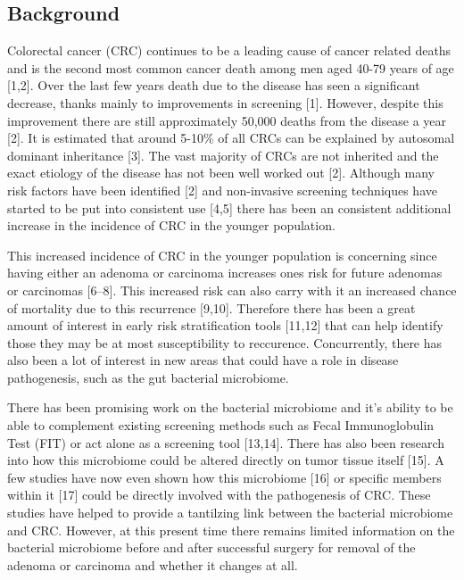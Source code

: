 \documentclass[12pt,]{article}
\begin{document}
\newpage

\subsection{Background}\label{background}

Colorectal cancer (CRC) continues to be a leading cause of cancer
related deaths and is the second most common cancer death among men aged
40-79 years of age {[}1,2{]}. Over the last few years death due to the
disease has seen a significant decrease, thanks mainly to improvements
in screening {[}1{]}. However, despite this improvement there are still
approximately 50,000 deaths from the disease a year {[}2{]}. It is
estimated that around 5-10\% of all CRCs can be explained by autosomal
dominant inheritance {[}3{]}. The vast majority of CRCs are not
inherited and the exact etiology of the disease has not been well worked
out {[}2{]}. Although many risk factors have been identified {[}2{]} and
non-invasive screening techniques have started to be put into consistent
use {[}4,5{]} there has been an consistent additional increase in the
incidence of CRC in the younger population.

This increased incidence of CRC in the younger population is concerning
since having either an adenoma or carcinoma increases ones risk for
future adenomas or carcinomas {[}6--8{]}. This increased risk can also
carry with it an increased chance of mortality due to this recurrence
{[}9,10{]}. Therefore there has been a great amount of interest in early
risk stratification tools {[}11,12{]} that can help identify those they
may be at most susceptibility to reccurence. Concurrently, there has
also been a lot of interest in new areas that could have a role in
disease pathogenesis, such as the gut bacterial microbiome.

There has been promising work on the bacterial microbiome and it's
ability to be able to complement existing screening methods such as
Fecal Immunoglobulin Test (FIT) or act alone as a screening tool
{[}13,14{]}. There has also been research into how this microbiome could
be altered directly on tumor tissue itself {[}15{]}. A few studies have
now even shown how this microbiome {[}16{]} or specific members within
it {[}17{]} could be directly involved with the pathogenesis of CRC.
These studies have helped to provide a tantilzing link between the
bacterial microbiome and CRC. However, at this present time there
remains limited information on the bacterial microbiome before and after
successful surgery for removal of the adenoma or carcinoma and whether
it changes at all.
\end{document}
